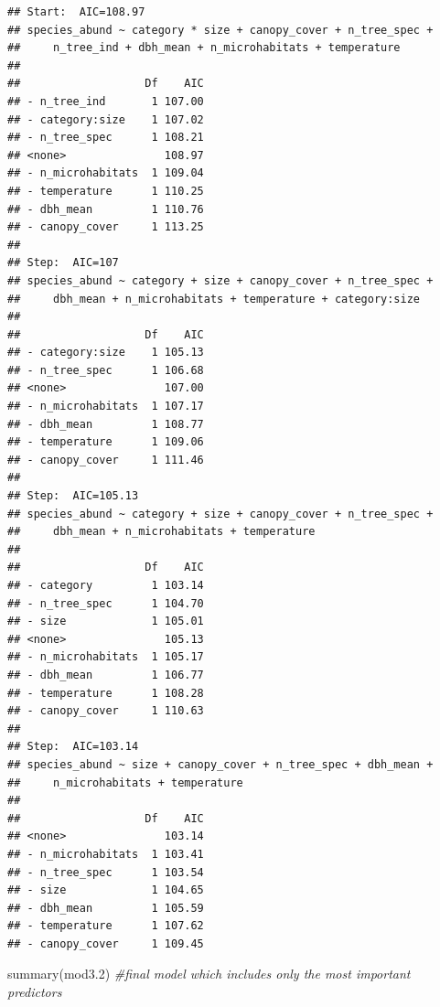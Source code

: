 \documentclass[
]{article}
\newenvironment{Shaded}{\begin{snugshade}}{\end{snugshade}}
\newcommand{\CommentTok}[1]{\textcolor[rgb]{0.56,0.35,0.01}{\textit{#1}}}
\newcommand{\FloatTok}[1]{\textcolor[rgb]{0.00,0.00,0.81}{#1}}
\newcommand{\FunctionTok}[1]{\textcolor[rgb]{0.00,0.00,0.00}{#1}}
\newcommand{\NormalTok}[1]{#1}
\begin{document}
\begin{verbatim}
## Start:  AIC=108.97
## species_abund ~ category * size + canopy_cover + n_tree_spec + 
##     n_tree_ind + dbh_mean + n_microhabitats + temperature
## 
##                   Df    AIC
## - n_tree_ind       1 107.00
## - category:size    1 107.02
## - n_tree_spec      1 108.21
## <none>               108.97
## - n_microhabitats  1 109.04
## - temperature      1 110.25
## - dbh_mean         1 110.76
## - canopy_cover     1 113.25
## 
## Step:  AIC=107
## species_abund ~ category + size + canopy_cover + n_tree_spec + 
##     dbh_mean + n_microhabitats + temperature + category:size
## 
##                   Df    AIC
## - category:size    1 105.13
## - n_tree_spec      1 106.68
## <none>               107.00
## - n_microhabitats  1 107.17
## - dbh_mean         1 108.77
## - temperature      1 109.06
## - canopy_cover     1 111.46
## 
## Step:  AIC=105.13
## species_abund ~ category + size + canopy_cover + n_tree_spec + 
##     dbh_mean + n_microhabitats + temperature
## 
##                   Df    AIC
## - category         1 103.14
## - n_tree_spec      1 104.70
## - size             1 105.01
## <none>               105.13
## - n_microhabitats  1 105.17
## - dbh_mean         1 106.77
## - temperature      1 108.28
## - canopy_cover     1 110.63
## 
## Step:  AIC=103.14
## species_abund ~ size + canopy_cover + n_tree_spec + dbh_mean + 
##     n_microhabitats + temperature
## 
##                   Df    AIC
## <none>               103.14
## - n_microhabitats  1 103.41
## - n_tree_spec      1 103.54
## - size             1 104.65
## - dbh_mean         1 105.59
## - temperature      1 107.62
## - canopy_cover     1 109.45
\end{verbatim}

\begin{Shaded}
\begin{Highlighting}[]
\FunctionTok{summary}\NormalTok{(mod3}\FloatTok{.2}\NormalTok{) }\CommentTok{\#final model which includes only the most important predictors }
\end{Highlighting}
\end{Shaded}
\end{document}
